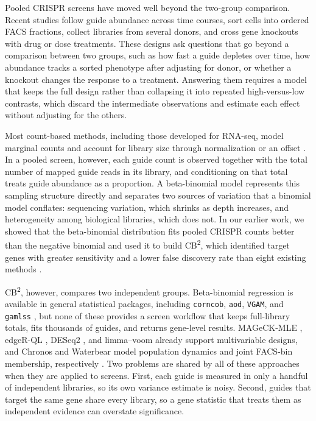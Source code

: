 Pooled CRISPR screens have moved well beyond the two-group comparison.  Recent
studies follow guide abundance across time courses, sort cells into ordered
FACS fractions, collect libraries from several donors, and cross gene
knockouts with drug or dose treatments.  These designs ask questions that go
beyond a comparison between two groups, such as how fast a guide depletes
over time, how abundance tracks a sorted phenotype after adjusting for donor,
or whether a knockout changes the response to a treatment.  Answering them
requires a model that keeps the full design rather than collapsing it into
repeated high-versus-low contrasts, which discard the intermediate
observations and estimate each effect without adjusting for the others.

Most count-based methods, including those developed for RNA-seq, model
marginal counts and account for library size through normalization or an
offset \citep{marioni2008rnaseq,anders2010deseq,love2014deseq2,lun2016edger}.
In a pooled screen, however, each guide count is observed together with the
total number of mapped guide reads in its library, and conditioning on that
total treats guide abundance as a proportion.  A beta-binomial model
represents this sampling structure directly and separates two sources of
variation that a binomial model conflates: sequencing variation, which shrinks
as depth increases, and heterogeneity among biological libraries, which does
not.  In our earlier work, we showed that the beta-binomial distribution fits
pooled CRISPR counts better than the negative binomial and used it to build
CB\textsuperscript{2}, which identified target genes with greater sensitivity
and a lower false discovery rate than eight existing methods
\citep{jeong2019beta}.

CB\textsuperscript{2}, however, compares two independent groups.
Beta-binomial regression is available in general statistical packages,
including \texttt{corncob}, \texttt{aod}, \texttt{VGAM}, and \texttt{gamlss}
\citep{martin2020corncob,lesnoff2012aod,yee1996vgam,rigby2005gamlss}, but none
of these provides a screen workflow that keeps full-library totals, fits
thousands of guides, and returns gene-level results.  MAGeCK-MLE
\citep{li2014mageck}, edgeR-QL \citep{lun2016edger}, DESeq2
\citep{love2014deseq2}, and limma--voom \citep{law2014voom} already support
multivariable designs, and Chronos and Waterbear model population dynamics and
joint FACS-bin membership, respectively
\citep{dempster2021chronos,pimentel2024waterbear}.  Two problems are shared by
all of these approaches when they are applied to screens.  First, each guide is
measured in only a handful of independent libraries, so its own variance
estimate is noisy.  Second, guides that target the same gene share every
library, so a gene statistic that treats them as independent evidence can
overstate significance.

